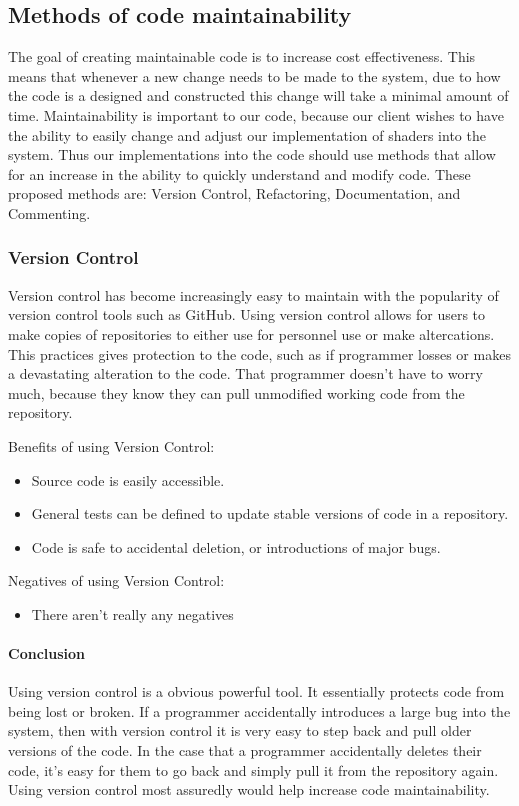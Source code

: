 \documentclass[10pt,journal,compsoc,draftclsnofoot]{IEEEtran}
\begin{document}
\subsection{Methods of code maintainability}
The goal of creating maintainable code is to increase cost effectiveness.
This means that whenever a new change needs to be made to the system, due to how the code is a designed and constructed this change will take a minimal amount of time.\cite{maintainability}
Maintainability is important to our code, because our client wishes to have the ability to easily change and adjust our implementation of shaders into the system.
Thus our implementations into the code should use methods that allow for an increase in the ability to quickly understand and modify code.
These proposed methods are: Version Control, Refactoring, Documentation, and Commenting.

\subsubsection{Version Control}
Version control has become increasingly easy to maintain with the popularity of version control tools such as GitHub.
Using version control allows for users to make copies of repositories to either use for personnel use or make altercations.
This practices gives protection to the code, such as if programmer losses or makes a devastating alteration to the code.
That programmer doesn't have to worry much, because they know they can pull unmodified working code from the repository.\cite{version}

Benefits of using Version Control:
\begin{itemize}
\item Source code is easily accessible.
\item General tests can be defined to update stable versions of code in a repository.
\item Code is safe to accidental deletion, or introductions of major bugs.
\end{itemize}

Negatives of using Version Control:
\begin{itemize}
\item There aren't really any negatives
\end{itemize}

\paragraph{Conclusion}
\vspace{3mm}
Using version control is a obvious powerful tool.
It essentially protects code from being lost or broken.
If a programmer accidentally introduces a large bug into the system, then with version control it is very easy to step back and pull older versions of the code.
In the case that a programmer accidentally deletes their code, it's easy for them to go back and simply pull it from the repository again.
Using version control most assuredly would help increase code maintainability.
\end{document}
